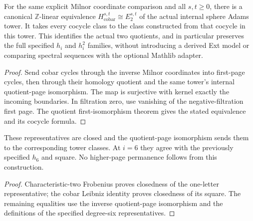 \begin{proposition}
  \label{prop:milnor-cobar-internal-e2}
  \leanok
  For the same explicit Milnor coordinate comparison and all $s,t\ge0$,
  there is a canonical $\mathbb Z$-linear equivalence
  $H^{s,t}_{\mathrm{cobar}}\cong E_2^{s,t}$ of the actual internal sphere
  Adams tower. It takes every cocycle class to the class constructed from
  that cocycle in this tower. This identifies the actual two quotients,
  and in particular preserves the full specified $h_i$ and $h_i^2$ families,
  without introducing a derived Ext model or comparing spectral sequences
  with the optional Mathlib adapter.
\end{proposition}
\begin{proof}
  Send cobar cycles through the inverse Milnor coordinates into first-page
  cycles, then through their homology quotient and the same tower's
  internal quotient-page isomorphism. The map is surjective with kernel
  exactly the incoming boundaries. In filtration zero, use vanishing of
  the negative-filtration first page. The quotient first-isomorphism
  theorem gives the stated equivalence and its cocycle formula.
  \leanok
\end{proof}

\begin{proposition}
  \label{prop:milnor-internal-hi-family}
  \leanok
  These representatives are closed and the quotient-page isomorphism sends
  them to the corresponding tower classes. At $i=6$ they agree with the
  previously specified $h_6$ and square. No higher-page permanence follows
  from this construction.
\end{proposition}
\begin{proof}
  Characteristic-two Frobenius proves closedness of the one-letter
  representative; the cobar Leibniz identity proves closedness of its square.
  The remaining equalities use the inverse quotient-page isomorphism and
  the definitions of the specified degree-six representatives.
  \leanok
\end{proof}

